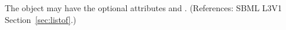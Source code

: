 The  object may have the optional attributes   and
. (References: SBML L3V1 Section~\ref{sec:listof}.)
